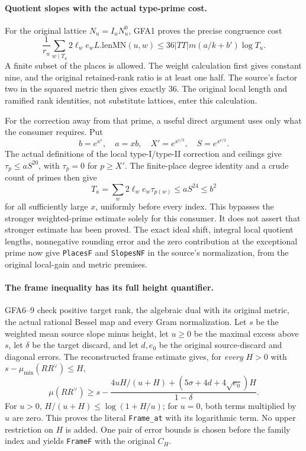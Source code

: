 \paragraph{Quotient slopes with the actual type-prime cost.}
For the original lattice \(N_u=I_uN_u^0\), GFA1 proves the precise
congruence cost
\[
 \frac1{r_u}\sum_{w\mid T_u}2\ell_we_w
                  L.\mathrm{lenMN}(u,w)
 \le36|TT|m(a/k+b')\log T_u.                         \tag{AU34.1}
\]
A finite subset of the places is allowed. The weight calculation
first gives constant nine, and the original retained-rank ratio is
at least one half. The source's factor two in the squared metric
then gives exactly 36. The original local length and ramified rank
identities, not substitute lattices, enter this calculation.

For the correction away from that prime, a useful direct argument
uses only what the consumer requires. Put
\[
 b=e^{x^\epsilon},\quad a=xb,\quad
 X'=e^{x^{\epsilon/3}},\quad S=e^{x^{\epsilon/2}}.
\]
The actual definitions of the local type-I/type-II correction and
ceilings give \(\tau_p\le aS^{20}\), with \(\tau_p=0\) for
\(p\ge X'\). The finite-place degree identity and a crude count of
primes then give
\[
 T_a=\sum_w2\ell_we_w\tau_{p(w)}
       \le aS^{24}\le b^2                              \tag{AU34.2}
\]
for all sufficiently large \(x\), uniformly before every index.
This bypasses the stronger weighted-prime estimate solely for this
consumer. It does not assert that stronger estimate has been proved.
The exact ideal shift, integral local quotient lengths, nonnegative
rounding error and the zero contribution at the exceptional prime
now give \texttt{PlacesF} and \texttt{SlopesNF} in the source's
normalization, from the original local-gain and metric premises.

\paragraph{The frame inequality has its full height quantifier.}
GFA6--9 check positive target rank, the algebraic dual with its
original metric, the actual rational Bessel map and every Gram
normalization. Let \(s\) be the weighted mean source slope minus
height, let \(u\ge0\) be the maximal excess above \(s\), let
\(\delta\) be the target discard, and let \(d,e_0\) be the
original source-discard and diagonal errors. The reconstructed
frame estimate gives, for \emph{every} \(H>0\) with
\(s-\mu_{\min}(RR^\vee)\le H\),
\[
 \mu(RR^\vee)\ge s-
 \frac{4uH/(u+H)+(5\sigma+4d+4\sqrt{e_0})H}{1-\delta}.
                                                               \tag{AU34.3}
\]
For \(u>0\), \(H/(u+H)\le\log(1+H/u)\); for \(u=0\), both
terms multiplied by \(u\) are zero. This proves the literal
\texttt{Frame\_at} with its logarithmic term. No upper restriction
on \(H\) is added. One pair of error bounds is chosen before the
family index and yields \texttt{FrameF} with the original \(C_H\).

